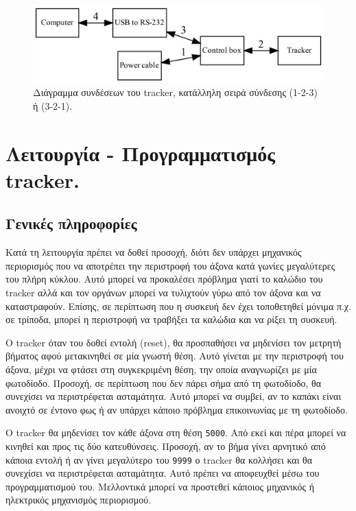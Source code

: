\documentclass[
  a4paper,
  twoside,
  titlepage,
  12pt]{article}
\numberwithin{equation}{section}
\numberwithin{figure}{section}
\numberwithin{table}{section}
\begin{document}
\begin{figure}

{\centering \includegraphics[width=0.8\linewidth]{figure/trackercomm} 

}

\caption{Διάγραμμα συνδέσεων του tracker, κατάλληλη σειρά σύνδεσης (1-2-3) ή (3-2-1).}\label{fig:trackercomm}
\end{figure}

\newpage

\hypertarget{trackeroperation}{%
\section{Λειτουργία - Προγραμματισμός tracker.}\label{trackeroperation}}

\hypertarget{ux3b3ux3b5ux3bdux3b9ux3baux3adux3c2-ux3c0ux3bbux3b7ux3c1ux3bfux3c6ux3bfux3c1ux3afux3b5ux3c2}{%
\subsection{Γενικές πληροφορίες}\label{ux3b3ux3b5ux3bdux3b9ux3baux3adux3c2-ux3c0ux3bbux3b7ux3c1ux3bfux3c6ux3bfux3c1ux3afux3b5ux3c2}}

Κατά τη λειτουργία πρέπει να δοθεί προσοχή, διότι δεν υπάρχει μηχανικός περιορισμός που να αποτρέπει την περιστροφή του άξονα κατά γωνίες μεγαλύτερες του πλήρη κύκλου.
Αυτό μπορεί να προκαλέσει πρόβλημα γιατί το καλώδιο του tracker αλλά και τον οργάνων μπορεί να τυλιχτούν γύρω από τον άξονα και να καταστραφούν.
Επίσης, σε περίπτωση που η συσκευή δεν έχει τοποθετηθεί μόνιμα π.χ. σε τρίποδα, μπορεί η περιστροφή να τραβήξει τα καλώδια και να ρίξει τη συσκευή.

Ο tracker όταν του δοθεί εντολή (reset), θα προσπαθήσει να μηδενίσει τον μετρητή βήματος αφού μετακινηθεί σε μία γνωστή θέση.
Αυτό γίνεται με την περιστροφή του άξονα, μέχρι να φτάσει στη συγκεκριμένη θέση, την οποία αναγνωρίζει με μία φωτοδίοδο.
Προσοχή, σε περίπτωση που δεν πάρει σήμα από τη φωτοδίοδο, θα συνεχίσει να περιστρέφεται ασταμάτητα.
Αυτό μπορεί να συμβεί, αν το καπάκι είναι ανοιχτό σε έντονο φως ή αν υπάρχει κάποιο πρόβλημα επικοινωνίας με τη φωτοδίοδο.

Ο tracker θα μηδενίσει τον κάθε άξονα στη θέση \texttt{\textquotesingle{}5000\textquotesingle{}}. Από εκεί και πέρα μπορεί να κινηθεί και προς τις δύο κατευθύνσεις.
Προσοχή, αν το βήμα γίνει αρνητικό από κάποια εντολή ή αν γίνει μεγαλύτερο του \texttt{\textquotesingle{}9999\textquotesingle{}} ο tracker θα κολλήσει και θα συνεχίσει να περιστρέφεται ασταμάτητα.
Αυτό πρέπει να αποφευχθεί μέσω του προγραμματισμού του. Μελλοντικά μπορεί να προστεθεί κάποιος μηχανικός ή ηλεκτρικός μηχανισμός περιορισμού.
\end{document}
